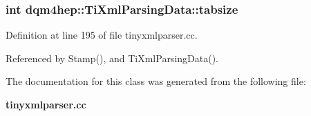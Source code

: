\subsubsection[{tabsize}]{\setlength{\rightskip}{0pt plus 5cm}int dqm4hep\+::\+Ti\+Xml\+Parsing\+Data\+::tabsize\hspace{0.3cm}{\ttfamily [private]}}\label{classdqm4hep_1_1TiXmlParsingData_a080549231900fcb0371895c7180c44a7}


Definition at line 195 of file tinyxmlparser.\+cc.



Referenced by Stamp(), and Ti\+Xml\+Parsing\+Data().



The documentation for this class was generated from the following file\+:\begin{DoxyCompactItemize}
\item 
{\bf tinyxmlparser.\+cc}\end{DoxyCompactItemize}
